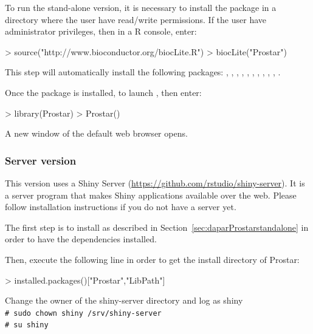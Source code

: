 \documentclass[12pt]{article}
\newcommand{\shellcmd}[1]{\\\indent\indent\texttt{\footnotesize\# #1}}
\begin{document}
To run the stand-alone version, it is necessary to install the package in a 
directory where the user have read/write permissions. If the user have 
administrator privileges, then in a R console, enter:
\begin{Schunk}
\begin{Sinput}
> source("http://www.bioconductor.org/biocLite.R")
> biocLite("Prostar")
\end{Sinput}
\end{Schunk}

This step will automatically install the following packages: , 
, , , 
, , , , 
, , .

Once the package is installed, to launch , then enter:
\begin{Schunk}
\begin{Sinput}
> library(Prostar)
> Prostar()
\end{Sinput}
\end{Schunk}

A new window of the default web browser opens. 


\subsubsection{Server version} \label{sec:daparProstarserver}
This version uses a Shiny Server 
(\url{https://github.com/rstudio/shiny-server}). It is a server program that 
makes Shiny applications available over the web. Please follow installation 
instructions if you do not have a server yet.

The first step is to install  as described in 
Section~\ref{sec:daparProstarstandalone} in order to have the dependencies 
installed.

Then, execute the following line in order to get the install directory of 
Prostar:

\begin{Schunk}
\begin{Sinput}
> installed.packages()["Prostar","LibPath"]
\end{Sinput}
\end{Schunk}


Change the owner of the shiny-server directory and log as shiny
\shellcmd{sudo chown shiny /srv/shiny-server}
\shellcmd{su shiny}\newline
\end{document}
